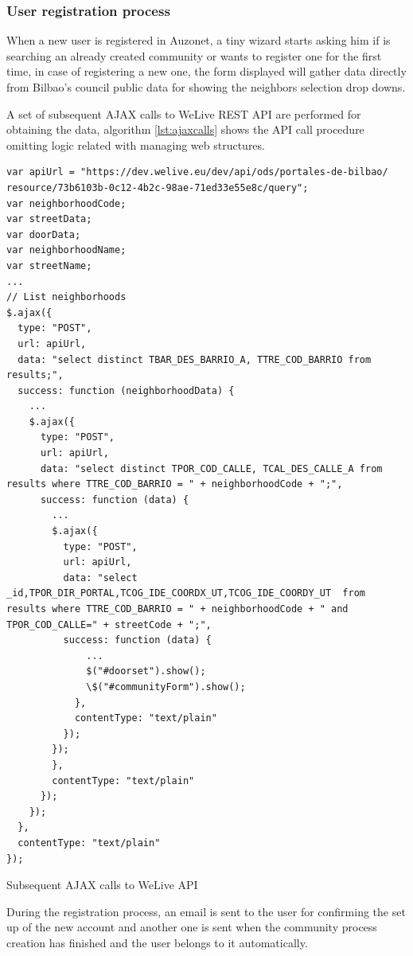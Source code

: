 \documentclass{DeustoFDP}
\begin{document}
\subsubsection{User registration process}
When a new user is registered in Auzonet, a tiny wizard starts asking him if is searching an already created community or wants to register one for the first time, in case of registering a new one, the form displayed will gather data directly from Bilbao's council public data for showing the neighbors selection drop downs.

A set of subsequent AJAX calls to WeLive REST API are performed for obtaining the data, algorithm \ref{lst:ajaxcalls} shows the API call procedure omitting logic related with managing web structures.

\begin{listing}[!h]\centering 
	\begin{minipage}{.9\textwidth}
		\begin{verbatim}
var apiUrl = "https://dev.welive.eu/dev/api/ods/portales-de-bilbao/
resource/73b6103b-0c12-4b2c-98ae-71ed33e55e8c/query";
var neighborhoodCode;
var streetData;
var doorData;
var neighborhoodName;
var streetName;
...
// List neighborhoods
$.ajax({
  type: "POST",
  url: apiUrl,
  data: "select distinct TBAR_DES_BARRIO_A, TTRE_COD_BARRIO from results;",
  success: function (neighborhoodData) {
    ...
    $.ajax({
      type: "POST",
      url: apiUrl,
      data: "select distinct TPOR_COD_CALLE, TCAL_DES_CALLE_A from results where TTRE_COD_BARRIO = " + neighborhoodCode + ";",
      success: function (data) {
        ...
        $.ajax({
          type: "POST",
          url: apiUrl,
          data: "select _id,TPOR_DIR_PORTAL,TCOG_IDE_COORDX_UT,TCOG_IDE_COORDY_UT  from results where TTRE_COD_BARRIO = " + neighborhoodCode + " and TPOR_COD_CALLE=" + streetCode + ";",
          success: function (data) {
              ...
              $("#doorset").show();
              \$("#communityForm").show();
            },
            contentType: "text/plain"
          });
        });
        },
        contentType: "text/plain"
      });
    });
  },
  contentType: "text/plain"
});
		\end{verbatim}
	\end{minipage}
	\caption{Subsequent AJAX calls to WeLive API }\label{lst:ajaxcalls}
\end{listing}

During the registration process, an email is sent to the user for confirming the set up of the new account and another one is sent when the community process creation has finished and the user belongs to it automatically.
\end{document}
